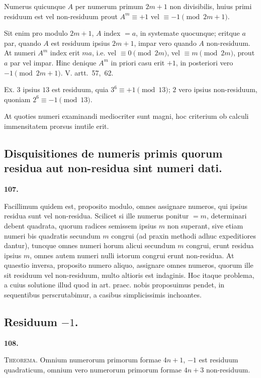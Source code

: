 \documentclass[12pt,a4paper]{article}
\theoremstyle{plain}
\theoremstyle{definition}
\theoremstyle{remark}
\begin{document}
Numerus quicunque $A$ per numerum primum $2m+1$ non divisibilis, huius primi residuum est vel non-residuum prout $A^m \equiv +1$ vel $\equiv -1 \pmod{2m+1}$.

Sit enim pro modulo $2m+1$, $A$ index $=a$, in systemate quocunque; eritque $a$ par, quando $A$ est residuum ipsius $2m+1$, impar vero quando $A$ non-residuum. At numeri $A^m$ index erit $ma$, i.e. vel $\equiv 0 \pmod{2m}$, vel $\equiv m \pmod{2m}$, prout $a$ par vel impar. Hinc denique $A^m$ in priori casu erit $+1$, in posteriori vero $-1 \pmod{2m+1}$. V. artt.~57,~62.

\textsc{Ex.} $3$ ipsius $13$ est residuum, quia $3^6 \equiv +1 \pmod{13}$; $2$ vero ipsius non-residuum, quoniam $2^6 \equiv -1 \pmod{13}$.

At quoties numeri examinandi mediocriter sunt magni, hoc criterium ob calculi immensitatem prorsus inutile erit.

\subsection*{Disquisitiones de numeris primis quorum residua aut non-residua sint numeri dati.}

\setcounter{satz}{107}
\addtocounter{satz}{-1}
\textbf{107.}

Facillimum quidem est, proposito modulo, omnes assignare numeros, qui ipsius residua sunt vel non-residua. Scilicet si ille numerus ponitur $=m$, determinari debent quadrata, quorum radices semissem ipsius $m$ non superant, sive etiam numeri bis quadratis secundum $m$ congrui (ad praxin methodi adhuc expeditiores dantur), tuncque omnes numeri horum alicui secundum $m$ congrui, erunt residua ipsius $m$, omnes autem numeri nulli istorum congrui erunt non-residua. At quaestio inversa, proposito numero aliquo, assignare omnes numeros, quorum ille sit residuum vel non-residuum, multo altioris est indaginis. Hoc itaque problema, a cuius solutione illud quod in art. praec. nobis proposuimus pendet, in sequentibus perscrutabimur, a casibus simplicissimis inchoantes.

\subsection*{Residuum $-1$.}

\setcounter{satz}{108}
\addtocounter{satz}{-1}
\textbf{108.}

\textsc{Theorema.} Omnium numerorum primorum formae $4n+1$, $-1$ est residuum quadraticum, omnium vero numerorum primorum formae $4n+3$ non-residuum.
\end{document}
